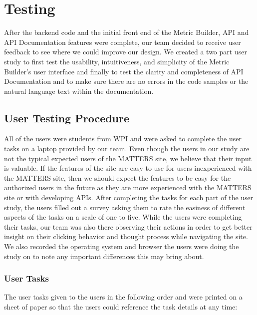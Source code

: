 \chapter{Testing}

	After the backend code and the initial front end of the Metric Builder, 
	API and API Documentation features were complete, our team decided to receive 
	user feedback to see where we could improve our design. We created a two part 
	user study to first test the usability, intuitiveness, and simplicity of the 
	Metric Builder’s user interface and finally to test the clarity and completeness 
	of API Documentation and to make sure there are no errors in the code samples 
	or the natural language text within the documentation. 

	\section{User Testing Procedure}

		All of the users were students from WPI and were asked to complete the user tasks on a 
		laptop provided by our team. Even though the users in our study are not the typical 
		expected users of the MATTERS site, we believe that their input is valuable. 
		If the features of the site are easy to use for users inexperienced with the MATTERS site, 
		then we should expect the features to be easy for the authorized users in the future as they 
		are more experienced with the MATTERS site or with developing APIs. After completing the tasks 
		for each part of the user study, the users filled out a survey asking them to rate the 
		easiness of different aspects of the tasks on a scale of one to five. While the users were 
		completing their tasks, our team was also there observing their actions in order to get better 
		insight on their clicking behavior and thought process while navigating the site. 
		We also recorded the operating system and browser the users were doing the study on to 
		note any important differences this may bring about.

		\subsection{User Tasks}
		
			The user tasks given to the users in the following order and were printed on a 
			sheet of paper so that the users could reference the task details at any time:
			
